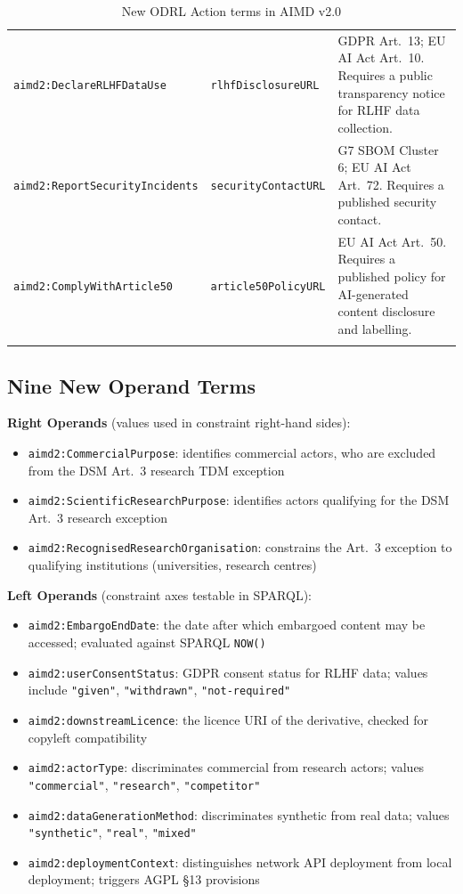 \documentclass[12pt,a4paper]{article}
\begin{document}
\begin{longtable}{@{}>{\footnotesize}p{6.0cm}>{\footnotesize}p{4.5cm}>{\footnotesize}p{4.3cm}@{}}
\texttt{aimd2:DeclareRLHFDataUse} & \texttt{rlhfDisclosureURL} & GDPR Art.\ 13; EU AI Act Art.\ 10. Requires a public transparency notice for RLHF data collection. \\[4pt]
\texttt{aimd2:ReportSecurityIncidents} & \texttt{securityContactURL} & G7 SBOM Cluster 6; EU AI Act Art.\ 72. Requires a published security contact. \\[4pt]
\texttt{aimd2:ComplyWithArticle50} & \texttt{article50PolicyURL} & EU AI Act Art.\ 50. Requires a published policy for AI-generated content disclosure and labelling. \\
\bottomrule
\caption{New ODRL Action terms in AIMD v2.0}
\end{longtable}

\subsection{Nine New Operand Terms}

\textbf{Right Operands} (values used in constraint right-hand sides):

\begin{itemize}[noitemsep]
  \item \texttt{aimd2:CommercialPurpose}: identifies commercial actors, who are excluded from the DSM Art.\ 3 research TDM exception
  \item \texttt{aimd2:ScientificResearchPurpose}: identifies actors qualifying for the DSM Art.\ 3 research exception
  \item \texttt{aimd2:RecognisedResearchOrganisation}: constrains the Art.\ 3 exception to qualifying institutions (universities, research centres)
\end{itemize}

\textbf{Left Operands} (constraint axes testable in SPARQL):

\begin{itemize}[noitemsep]
  \item \texttt{aimd2:EmbargoEndDate}: the date after which embargoed content may be accessed; evaluated against SPARQL \texttt{NOW()}
  \item \texttt{aimd2:userConsentStatus}: GDPR consent status for RLHF data; values include \texttt{"given"}, \texttt{"withdrawn"}, \texttt{"not-required"}
  \item \texttt{aimd2:downstreamLicence}: the licence URI of the derivative, checked for copyleft compatibility
  \item \texttt{aimd2:actorType}: discriminates commercial from research actors; values \texttt{"commercial"}, \texttt{"research"}, \texttt{"competitor"}
  \item \texttt{aimd2:dataGenerationMethod}: discriminates synthetic from real data; values \texttt{"synthetic"}, \texttt{"real"}, \texttt{"mixed"}
  \item \texttt{aimd2:deploymentContext}: distinguishes network API deployment from local deployment; triggers AGPL \S 13 provisions
\end{itemize}
\end{document}
